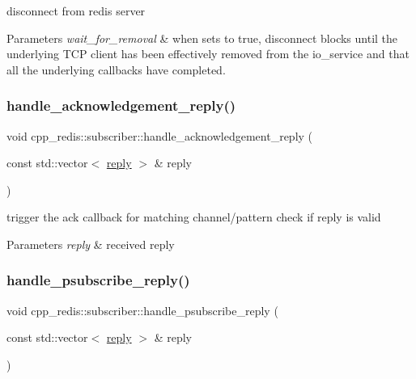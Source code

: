 disconnect from redis server


\begin{DoxyParams}{Parameters}
{\em wait\+\_\+for\+\_\+removal} & when sets to true, disconnect blocks until the underlying T\+CP client has been effectively removed from the io\+\_\+service and that all the underlying callbacks have completed. \\
\hline
\end{DoxyParams}
\mbox{\label{classcpp__redis_1_1subscriber_ade918ef2347138492fe213450f27bcfd}} 
\subsubsection{\texorpdfstring{handle\+\_\+acknowledgement\+\_\+reply()}{handle\_acknowledgement\_reply()}}
{\footnotesize\ttfamily void cpp\+\_\+redis\+::subscriber\+::handle\+\_\+acknowledgement\+\_\+reply (\begin{DoxyParamCaption}\item[{const std\+::vector$<$ \hyperlink{classcpp__redis_1_1reply}{reply} $>$ \&}]{reply }\end{DoxyParamCaption})\hspace{0.3cm}{\ttfamily [private]}}

trigger the ack callback for matching channel/pattern check if reply is valid


\begin{DoxyParams}{Parameters}
{\em reply} & received reply \\
\hline
\end{DoxyParams}
\mbox{\label{classcpp__redis_1_1subscriber_a6e67df5af6170ad55e77082f18f63d76}} 
\subsubsection{\texorpdfstring{handle\+\_\+psubscribe\+\_\+reply()}{handle\_psubscribe\_reply()}}
{\footnotesize\ttfamily void cpp\+\_\+redis\+::subscriber\+::handle\+\_\+psubscribe\+\_\+reply (\begin{DoxyParamCaption}\item[{const std\+::vector$<$ \hyperlink{classcpp__redis_1_1reply}{reply} $>$ \&}]{reply }\end{DoxyParamCaption})\hspace{0.3cm}{\ttfamily [private]}}

